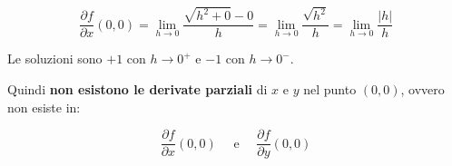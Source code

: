 \documentclass[a4paper]{article}
\begin{document}
	\begin{equation*}
		\dfrac{\partial f}{\partial x}\left(0,0\right) = \lim_{h \rightarrow 0} \dfrac{\sqrt{h^{2} + 0} - 0}{h} = \lim_{h \rightarrow 0} \dfrac{\sqrt{h^{2}}}{h} = \lim_{h \rightarrow 0} \dfrac{\left|h\right|}{h}
	\end{equation*}

	\noindent
	Le soluzioni sono $+1$ con $h \rightarrow 0^{+}$ e $-1$ con $h \rightarrow 0^{-}$.\newline
	
	\noindent
	Quindi \textbf{non esistono le derivate parziali} di $x$ e $y$ nel punto $\left(0,0\right)$, ovvero non esiste in:
	
	\begin{equation*}
		\dfrac{\partial f}{\partial x}\left(0,0\right) \hspace{1em} \text{ e } \hspace{1em} \dfrac{\partial f}{\partial y}\left(0,0\right)
	\end{equation*}
\end{document}
